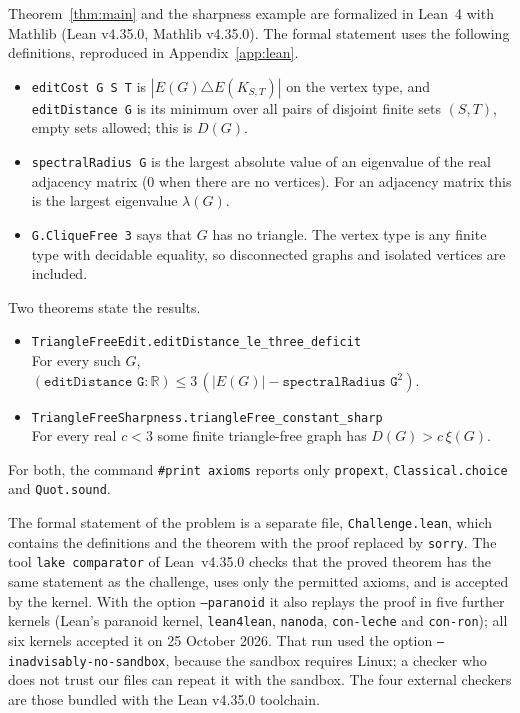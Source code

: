 \documentclass[11pt]{article}
\theoremstyle{remark}
\begin{document}
Theorem~\ref{thm:main} and the sharpness example are formalized in Lean~4 \cite{Lean4} with
Mathlib \cite{Mathlib} (Lean v4.35.0, Mathlib v4.35.0). The formal statement uses the following
definitions, reproduced in Appendix~\ref{app:lean}.
\begin{itemize}
  \item \texttt{editCost G S T} is $|E(G)\triangle E(K_{S,T})|$ on the vertex type, and
  \texttt{editDistance G} is its minimum over all pairs of disjoint finite sets $(S,T)$, empty
  sets allowed; this is $D(G)$.
  \item \texttt{spectralRadius G} is the largest absolute value of an eigenvalue of the real
  adjacency matrix ($0$ when there are no vertices). For an adjacency matrix this is the largest
  eigenvalue $\lambda(G)$.
  \item \texttt{G.CliqueFree 3} says that $G$ has no triangle. The vertex type is any finite type
  with decidable equality, so disconnected graphs and isolated vertices are included.
\end{itemize}
Two theorems state the results.
\begin{itemize}
  \item \texttt{TriangleFreeEdit.editDistance\_le\_three\_deficit}\\
  For every such $G$,
  $(\texttt{editDistance G}:\mathbb R)\le3\,(|E(G)|-\texttt{spectralRadius G}^2)$.
  \item \texttt{TriangleFreeSharpness.triangleFree\_constant\_sharp}\\
  For every real $c<3$ some finite triangle-free graph has $D(G)>c\,\xi(G)$.
\end{itemize}
For both, the command \texttt{\#print axioms} reports only \texttt{propext},
\texttt{Classical.choice} and \texttt{Quot.sound}.

The formal statement of the problem is a separate file, \texttt{Challenge.lean}, which contains
the definitions and the theorem with the proof replaced by \texttt{sorry}. The tool
\texttt{lake comparator} of Lean~v4.35.0 checks that the proved theorem has the same statement as
the challenge, uses only the permitted axioms, and is accepted by the kernel. With the option
\texttt{--paranoid} it also replays the proof in five further kernels (Lean's paranoid kernel,
\texttt{lean4lean}, \texttt{nanoda}, \texttt{con-leche} and \texttt{con-ron}); all six kernels
accepted it on 25 October 2026. That run used the option \texttt{--inadvisably-no-sandbox},
because the sandbox requires Linux; a checker who does not trust our files can repeat it with the
sandbox. The four external checkers are those bundled with the Lean v4.35.0 toolchain.
\end{document}
